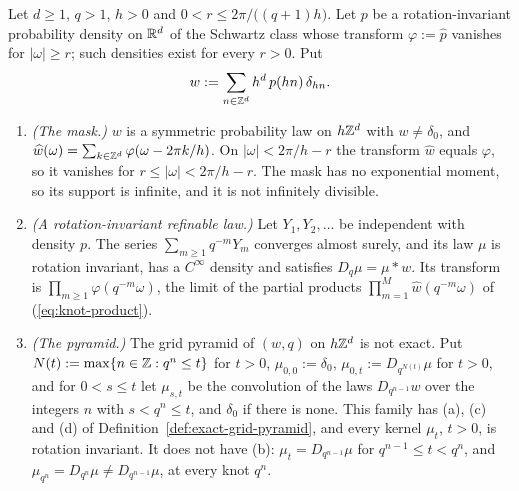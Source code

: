 \begin{proposition}
\label{prop:band-limited-refinable-mask}

Let $d \ge 1$, $q > 1$, $h > 0$ and $0 < r \le 2\pi/\bigl((q + 1)h\bigr)$. Let $p$ be a
rotation-invariant probability density on $\mathbb{R}^d$ of the Schwartz class whose transform
$\varphi := \widehat p$ vanishes for $|\omega| \ge r$; such densities exist for every $r > 0$. Put
\[
  w := \sum_{n \in \mathbb{Z}^d}h^d\,p(hn)\,\delta_{hn} .
\]
\begin{enumerate}
\item \emph{(The mask.)} $w$ is a symmetric probability law on $h\mathbb{Z}^d$ with $w \ne \delta_0$, and
$\widehat w(\omega) = \sum_{k \in \mathbb{Z}^d}\varphi(\omega - 2\pi k/h)$. On $|\omega| < 2\pi/h - r$
the transform $\widehat w$ equals $\varphi$, so it vanishes for $r \le |\omega| < 2\pi/h - r$. The
mask has no exponential moment, so its support is infinite, and it is not infinitely divisible.
\item \emph{(A rotation-invariant refinable law.)} Let $Y_1, Y_2, \dots$ be independent with
density $p$. The series $\sum_{m \ge 1}q^{-m}Y_m$ converges almost surely, and its law $\mu$ is
rotation invariant, has a $C^\infty$ density and satisfies $D_q\mu = \mu * w$. Its transform is
$\prod_{m \ge 1}\varphi(q^{-m}\omega)$, the limit of the partial products
$\prod_{m=1}^M\widehat w(q^{-m}\omega)$ of (\ref{eq:knot-product}).
\item \emph{(The pyramid.)} The grid pyramid of $(w, q)$ on $h\mathbb{Z}^d$ is not exact. Put
$N(t) := \max\{n \in \mathbb{Z} : q^n \le t\}$ for $t > 0$, $\mu_{0,0} := \delta_0$,
$\mu_{0,t} := D_{q^{N(t)}}\mu$ for $t > 0$, and for $0 < s \le t$ let $\mu_{s,t}$ be the
convolution of the laws $D_{q^{n-1}}w$ over the integers $n$ with $s < q^n \le t$, and $\delta_0$
if there is none. This family has (a), (c) and (d) of Definition~\ref{def:exact-grid-pyramid}, and
every kernel $\mu_t$, $t > 0$,
is rotation invariant. It does not have (b): $\mu_t = D_{q^{n-1}}\mu$ for
$q^{n-1} \le t < q^n$, and $\mu_{q^n} = D_{q^n}\mu \ne D_{q^{n-1}}\mu$, at every knot $q^n$.
\end{enumerate}
\end{proposition}

